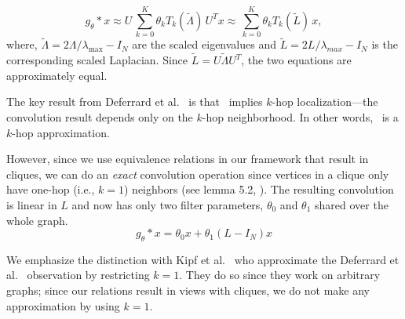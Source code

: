 \begin{equation}
  g_\theta \ast x \approx U \, \sum_{k=0}^K \theta_k T_k(\tilde{\Lambda}) \, U^T x \approx \, \sum_{k=0}^K \theta_k T_k(\tilde{L}) \, x,
  \label{eq:approx_gcn}
\end{equation}
where, $\tilde{\Lambda} = 2 \Lambda/ \lambda_{\max}- I_N$ are the scaled eigenvalues and $\tilde{L} = 2L/\lambda_{max} - I_N$ is the corresponding scaled Laplacian. Since $\tilde{L} = U \tilde{\Lambda} U^T$, the two equations are approximately equal.



The key result from Deferrard et al.~\cite{deferrard} is that~ implies $k$-hop localization---the convolution result depends only on the $k$-hop neighborhood. In other words,~  is a $k$-hop approximation.

However, since we use equivalence relations in our framework that result in cliques, we can do an \textit{exact} convolution operation since vertices in a clique only have one-hop (i.e., $k=1$) neighbors (see lemma 5.2, \cite{Hammond2011}). The resulting convolution is linear in $L$ and now has only two filter parameters, $\theta_{0}$ and $\theta_{1}$ shared over the whole graph.
\begin{equation}
g_{\theta} * x = \theta_{0}x + \theta_{1}\left(L-I_{N} \right)x %
\label{eq:restrictk}
\end{equation}

We emphasize the distinction with Kipf et al.~\cite{gcn} who approximate the Deferrard et al.~\cite{deferrard} observation by restricting $k=1$. They do so since they work on arbitrary graphs; since our relations result in views with cliques, we do not make any approximation by using $k=1$.





